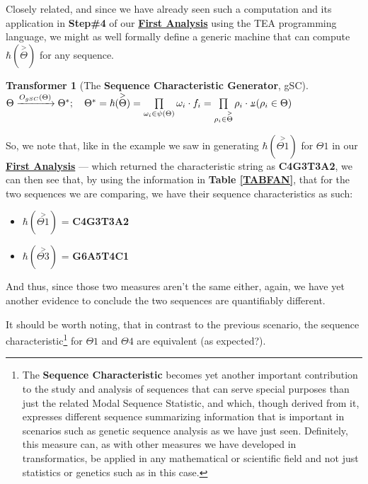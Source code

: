 \documentclass[a4paper, 18pt]{book} %
\newtheorem{transf}{Transformer}
\newcommand{\invpi}{\rotatebox[origin=c]{180}{$\pi$}}
\begin{document}
Closely related, and since we have already seen such a computation and its application in \textbf{Step\#4} of our \textbf{\hyperref[SECFANAL]{First Analysis}} using the TEA programming language, we might as well formally define a generic machine that can compute $\hbar(\overset{>}{\Theta})$ for any sequence.\\

\begin{transf}[The \textbf{Sequence Characteristic Generator}, gSC]
\label{TRANSFGENSEQCHAR}
$ $\\
$\Theta \xrightarrow{O_{gSC}(\Theta)} \Theta^*; \quad \Theta^* = \hbar(\overset{>}{\Theta}) = \prod\limits_{\omega_i \in \psi(\Theta)} \omega_i\cdot f_i = \prod\limits_{\rho_i \in \overset{>}{\Theta}} \rho_i\cdot \invpi(\rho_i \in \Theta)$
\end{transf}

So, we note that, like in the example we saw in generating $\hbar(\overset{>}{\Theta1})$ for $\Theta1$ in our \textbf{\hyperref[SECFANAL]{First Analysis}} --- which returned the characteristic string as \textbf{C4G3T3A2}, we can then see that, by using the information in \textbf{Table \ref{TABFAN}}, that for the two sequences we are comparing, we have their sequence characteristics as such:

\begin{itemize}
\item $\hbar(\overset{>}{\Theta1})$ = \textbf{C4G3T3A2}
\item $\hbar(\overset{>}{\Theta3})$ = \textbf{G6A5T4C1}
\end{itemize}

And thus, since those two measures aren't the same either, again, we have yet another evidence to conclude the two sequences are quantifiably different.

It should be worth noting, that in contrast to the previous scenario, the sequence characteristic\footnote{The \textbf{Sequence Characteristic} becomes yet another important contribution to the study and analysis of sequences that can serve special purposes than just the related Modal Sequence Statistic, and which, though derived from it, expresses different sequence summarizing information that is important in scenarios such as genetic sequence analysis as we have just seen. Definitely, this measure can, as with other measures we have developed in transformatics, be applied in any mathematical or scientific field and not just statistics or genetics such as in this case.} for $\Theta1$ and $\Theta4$ are equivalent (as expected?).
\end{document}
